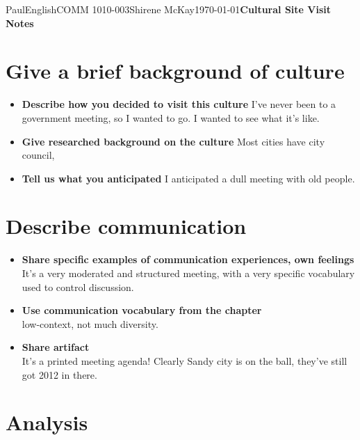 \documentclass[12pt,letterpaper]{article}
\begin{document}
\begin{mla}{Paul}{English}{COMM 1010-003}{Shirene
    McKay}{\today}{\textbf{Cultural Site Visit Notes}}

\section{Give a brief background of culture}

\begin{itemize}
  \item \textbf{Describe how you decided to visit this culture}
    I've never been to a government meeting, so I wanted to go. I
    wanted to see what it's like.
    
  \item \textbf{Give researched background on the culture}
    Most cities have city council, 
    
  \item \textbf{Tell us what you anticipated}
    I anticipated a dull meeting with old people.
    
\end{itemize}

\section{Describe communication}

\begin{itemize}
  \item \textbf{Share specific examples of communication experiences,
    own feelings} \\
    It's a very moderated and structured meeting, with a very specific
    vocabulary used to control discussion.
    
  \item \textbf{Use communication vocabulary from the chapter} \\
    low-context, not much diversity.
    
  \item \textbf{Share artifact} \\
    It's a printed meeting agenda! Clearly Sandy city is on the ball,
    they've still got 2012 in there.
    
\end{itemize}

\section{Analysis}


\end{mla}
\end{document}
